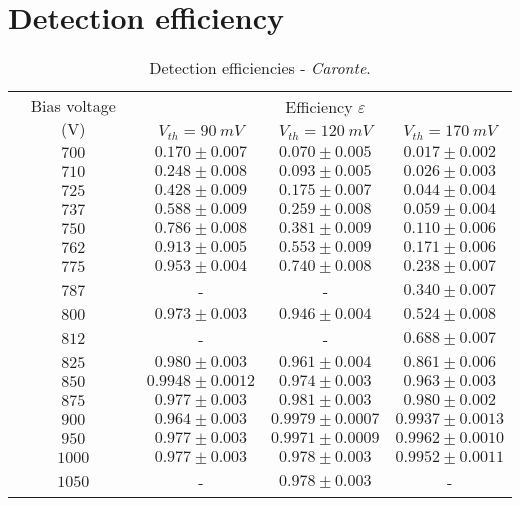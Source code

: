 

\section{Detection efficiency} \label{app:eff}

\begin{table}[!htp]
	\centering
	\begin{tabular}{c|ccc}
		\toprule
		\multirow{2}{*}{Bias voltage (V)}&\multicolumn{3}{c}{Efficiency $\varepsilon$} \\ \cline{2-4}
		&$V_{th}=\SI{90}{mV}$&$V_{th}=\SI{120}{mV}$&$V_{th}=\SI{170}{mV}$\\ \midrule
		$700$ & $0.170 \pm 0.007$ & $0.070 \pm 0.005$ & $0.017 \pm 0.002$ \\
		$710$ & $0.248 \pm 0.008$ & $0.093 \pm 0.005$ & $0.026 \pm 0.003$ \\
		$725$ & $0.428 \pm 0.009$ & $0.175 \pm 0.007$ & $0.044 \pm 0.004$ \\
		$737$ & $0.588 \pm 0.009$ & $0.259 \pm 0.008$ & $0.059 \pm 0.004$ \\
		$750$ & $0.786 \pm 0.008$ & $0.381 \pm 0.009$ & $0.110 \pm 0.006$ \\
		$762$ & $0.913 \pm 0.005$ & $0.553 \pm 0.009$ & $0.171 \pm 0.006$ \\
		$775$ & $0.953 \pm 0.004$ & $0.740 \pm 0.008$ & $0.238 \pm 0.007$ \\
		$787$ & - & - & $0.340 \pm 0.007$ \\
		$800$ & $0.973 \pm 0.003$ & $0.946 \pm 0.004$ & $0.524 \pm 0.008$ \\
		$812$ & - & - & $0.688 \pm 0.007$ \\
		$825$ & $0.980 \pm 0.003$ & $0.961 \pm 0.004$ & $0.861 \pm 0.006$ \\
		$850$ & $0.9948 \pm 0.0012$ & $0.974 \pm 0.003$ & $0.963 \pm 0.003$ \\
		$875$ & $0.977 \pm 0.003$ & $0.981 \pm 0.003$ & $0.980 \pm 0.002$ \\
		$900$ & $0.964 \pm 0.003$ & $0.9979 \pm 0.0007$ & $0.9937 \pm 0.0013$ \\
		$950$ & $0.977 \pm 0.003$ & $0.9971 \pm 0.0009$ & $0.9962 \pm 0.0010$ \\
		$1000$ & $0.977 \pm 0.003$ & $0.978 \pm 0.003$ & $0.9952 \pm 0.0011$ \\
		$1050$ & - & $0.978 \pm 0.003$ & - \\
		\bottomrule
	\end{tabular}
	\caption{Detection efficiencies - \emph{Caronte}.}
\end{table}

